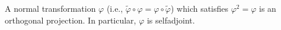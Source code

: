 A normal transformation $\varphi$ (i.e., $\tilde{\varphi} \circ \varphi = \varphi \circ \tilde{\varphi}$) which satisfies $\varphi^2 = \varphi$ is an orthogonal projection. In particular, $\varphi$ is selfadjoint.
